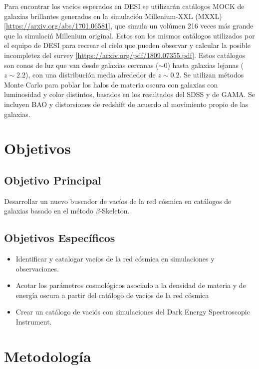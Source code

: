 \documentclass[preprint]{aastex62}
\begin{document}
  

  Para encontrar los vacíos esperados en DESI se utilizarán catálogos MOCK de galaxias brillantes
  generados en la simulación Millenium-XXL (MXXL) \ref{https://arxiv.org/abs/1701.06581}, que simula un
  volúmen 216 veces más grande que la simulaciń Millenium original. Estos
  son los mismos catálogos utilizados por el equipo de DESI para recrear el cielo que pueden
  observar y calcular la posible incompletez del survey \ref{https://arxiv.org/pdf/1809.07355.pdf}.
  Estos catálogos son conos de luz que van
  desde galaxias cercanas ($\sim0$) hasta galaxias lejanas ($z\sim2.2$), con una distribución
  media alrededor de $z\sim 0.2$. Se utilizan métodos Monte Carlo para poblar los halos de materia
  oscura con galaxias con luminosidad y color distintos, basados en los resultados del SDSS y de
  GAMA. Se incluyen BAO y distorsiones de redshift de acuerdo al movimiento propio de las galaxias.

  
  \section{Objetivos}

  \subsection{Objetivo Principal}
  Desarrollar un nuevo buscador de vacíos de la red cósmica en catálogos de galaxias
  basado en el método $\beta$-Skeleton.
  
  \subsection{Objetivos Específicos}

  \begin{itemize}    
      \item Identificar y catalogar vacíos de la red cósmica en
        simulaciones y observaciones.
      \item Acotar los parámetros cosmológicos asociado a la densidad
        de materia y de energía oscura a partir del catálogo de
        vacíos de la red cósmica
    \item  Crear un cat\'alogo de vaci\'os con simulaciones del Dark
      Energy Spectroscopic Instrument.
  \end{itemize}
  
  \section{Metodología}
\end{document}
